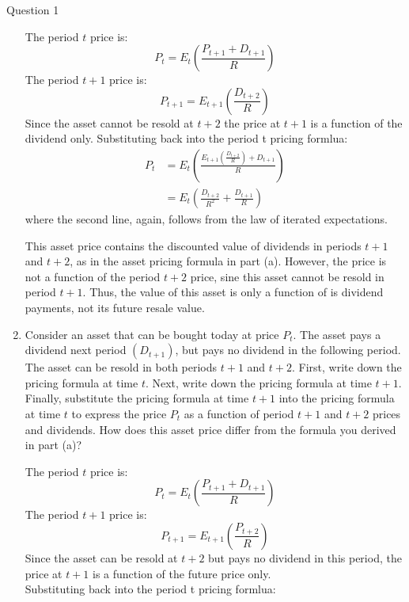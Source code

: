 \documentclass[a4paper]{article}
\newif\IfInSansMode
\begin{document}
\begin{questionbox}{Question 1}
\begin{enumerate}[resume*]
			\begin{explanationbox}
				The period \( t \) price is:
				\[
					P_t = E_t \left( \frac{P_{t+1} + D_{t+1}}{R} \right)
				\]
				The period \( t+1 \) price is:
				\[
					P_{t+1} = E_{t+1}\left( \frac{D_{t+2}}{R} \right)
				\]
				Since the asset cannot be resold at \( t+2 \) the price at \( t+1 \) is a function of the dividend only. Substituting back into the period t pricing formlua:
				\begin{align*}
					P_t &= E_t \left( \frac{E_{t+1} \left( \frac{D_{t+2}}{R} \right) + D_{t+1}}{R} \right)\\
					&=E_t \left( \frac{D_{t+2}}{R^2} + \frac{D_{t+1}}{R} \right)
				\end{align*}
				where the second line, again, follows from the law of iterated expectations.
			\end{explanationbox}
			\begin{explanationbox}
				This asset price contains the discounted value of dividends in periods \( t+1 \) and \( t+2 \), as in the asset pricing formula in part (a). However, the price is not a function of the period \( t+2 \) price, sine this asset cannot be resold in period \( t+1 \). Thus, the value of this asset is only a function of is dividend payments, not its future resale value.
			\end{explanationbox}
			\item Consider an asset that can be bought today at price \( P_t \). The asset pays a dividend next period \( (D_{t+1}) \), but pays no dividend in the following period. The asset can be resold in both periods \( t+1 \) and \( t+2 \). First, write down the pricing formula at time \( t \). Next, write down the pricing formula at time \( t+1 \). Finally, substitute the pricing formula at time \( t+1 \) into the pricing formula at time \( t \) to express the price \( P_t \) as a function of period \( t+1 \) and \( t+2 \) prices and dividends. How does this asset price differ from the formula you derived in part (a)?
			\begin{explanationbox}
				The period \( t \) price is:
				\[
					P_t = E_t \left( \frac{P_{t+1} + D_{t+1}}{R} \right)
				\]
				The period \( t+1 \) price is:
				\[
					P_{t+1} = E_{t+1}\left( \frac{P_{t+2}}{R} \right)
				\]
				Since the asset can be resold at \( t+2 \) but pays no dividend in this period, the price at \( t+1 \) is a function of the future price only.\\
				Substituting back into the period t pricing formlua:
				\begin{align*}

\end{align*}
\end{explanationbox}
\end{enumerate}
\end{questionbox}
\end{document}
